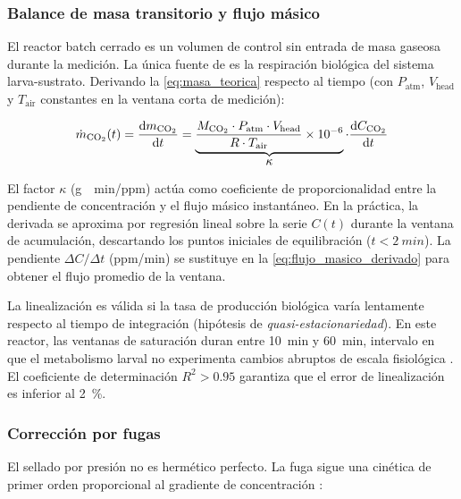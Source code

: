 \subsubsection{Balance de masa transitorio y flujo másico}

El reactor batch cerrado es un volumen de control sin entrada de masa gaseosa durante la medición. La única fuente de  es la respiración biológica del sistema larva-sustrato. Derivando la \cref{eq:masa_teorica} respecto al tiempo (con $P_{\text{atm}}$, $V_{\text{head}}$ y $T_{\text{air}}$ constantes en la ventana corta de medición):

\begin{equation}
\dot{m}_{\ce{CO2}}(t) 
= \frac{\mathrm{d} m_{\ce{CO2}}}{\mathrm{d} t}
= \underbrace{\frac{M_{\ce{CO2}} \cdot P_{\text{atm}} \cdot V_{\text{head}}}{R \cdot T_{\text{air}}} \times 10^{-6}}_{\displaystyle\kappa}
\cdot \frac{\mathrm{d} C_{\ce{CO2}}}{\mathrm{d} t}
\label{eq:flujo_masico_derivado}
\end{equation}

El factor $\kappa$ (\si{g\cdot min/ppm}) actúa como coeficiente de proporcionalidad entre la pendiente de concentración y el flujo másico instantáneo. En la práctica, la derivada se aproxima por regresión lineal sobre la serie $C(t)$ durante la ventana de acumulación, descartando los puntos iniciales de equilibración ($t < \SI{2}{min}$). La pendiente $\Delta C/\Delta t$ (\si{ppm/min}) se sustituye en la \cref{eq:flujo_masico_derivado} para obtener el flujo promedio de la ventana.

La linealización es válida si la tasa de producción biológica varía lentamente respecto al tiempo de integración (hipótesis de \emph{quasi-estacionariedad}). En este reactor, las ventanas de saturación duran entre \SI{10}{min} y \SI{60}{min}, intervalo en que el metabolismo larval no experimenta cambios abruptos de escala fisiológica \parencite{eriksenDynamicModellingFeed2022}. El coeficiente de determinación $R^2 > 0.95$ garantiza que el error de linealización es inferior al \SI{2}{\percent}.

\subsubsection{Corrección por fugas}

El sellado por presión no es hermético perfecto. La fuga sigue una cinética de primer orden proporcional al gradiente de concentración \parencite{hutchinsonMethodsSoilAnalysis1992}:


